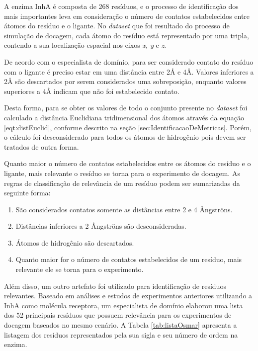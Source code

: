 A enzima InhA é composta de 268 resíduos, e o processo de identificação dos mais importantes leva em consideração o número de contatos estabelecidos entre átomos do resíduo e o ligante. No \emph{dataset} que foi resultado do processo de simulação de docagem, cada átomo do resíduo está representado por uma tripla, contendo a sua localização espacial nos eixos \emph{x, y }e \emph{z}.

De acordo com o especialista de domínio, para ser considerado contato do resíduo com o ligante é preciso estar em uma distância entre 2{\AA} e 4{\AA}. Valores inferiores a 2{\AA} são descartados por serem considerados uma sobreposição, enquanto valores superiores a 4{\AA} indicam que não foi estabelecido contato. 

Desta forma, para se obter os valores de todo o conjunto presente no \emph{dataset} foi calculado a distância Euclidiana tridimensional dos átomos através da equação \ref{eqt:distEuclid}, conforme descrito na seção \ref{sec:IdentificacaoDeMetricas}. Porém, o cálculo foi desconsiderado para todos os átomos de hidrogênio pois devem ser tratados de outra forma.

Quanto maior o número de contatos estabelecidos entre os átomos do resíduo e o ligante, mais relevante o resíduo se torna para o experimento de 
docagem. As regras de classificação de relevância de um resíduo podem ser sumarizadas da seguinte forma:

\begin{enumerate}
	\item São considerados contatos somente as distâncias entre 2 e 4 {\AA}ngstr\"ons.
	\item Distâncias inferiores a 2 {\AA}ngstr\"ons são desconsideradas.
	\item Átomos de hidrogênio são descartados.
	\item Quanto maior for o número de contatos estabelecidos de um resíduo, mais relevante ele se torna para o experimento.
\end{enumerate}

Além disso, um outro artefato foi utilizado para identificação de resíduos relevantes. Baseado em análises e estudos de experimentos anteriores utilizando a InhA como molécula receptora, um especialista de domínio elaborou uma lista dos 52 principais resíduos que possuem relevância para os experimentos de docagem baseados no mesmo cenário. 
A Tabela \ref{tab:listaOsmar} apresenta a listagem dos resíduos representados pela sua sigla e seu número de ordem na enzima.

